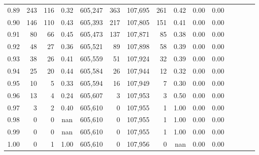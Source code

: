 \begin{tabular}{rrrcrrrrrrrrrrr}
0.89 &     243 &    116 &                                       0.32 &  605,247 &      363 &  107,695 &      261 &  0.42 &  0.00 &                         0.00 \\
0.90 &     146 &    110 &                                       0.43 &  605,393 &      217 &  107,805 &      151 &  0.41 &  0.00 &                         0.00 \\
0.91 &      80 &     66 &                                       0.45 &  605,473 &      137 &  107,871 &       85 &  0.38 &  0.00 &                         0.00 \\
0.92 &      48 &     27 &                                       0.36 &  605,521 &       89 &  107,898 &       58 &  0.39 &  0.00 &                         0.00 \\
0.93 &      38 &     26 &                                       0.41 &  605,559 &       51 &  107,924 &       32 &  0.39 &  0.00 &                         0.00 \\
0.94 &      25 &     20 &                                       0.44 &  605,584 &       26 &  107,944 &       12 &  0.32 &  0.00 &                         0.00 \\
0.95 &      10 &      5 &                                       0.33 &  605,594 &       16 &  107,949 &        7 &  0.30 &  0.00 &                         0.00 \\
0.96 &      13 &      4 &                                       0.24 &  605,607 &        3 &  107,953 &        3 &  0.50 &  0.00 &                         0.00 \\
0.97 &       3 &      2 &                                       0.40 &  605,610 &        0 &  107,955 &        1 &  1.00 &  0.00 &                         0.00 \\
0.98 &       0 &      0 &                                        nan &  605,610 &        0 &  107,955 &        1 &  1.00 &  0.00 &                         0.00 \\
0.99 &       0 &      0 &                                        nan &  605,610 &        0 &  107,955 &        1 &  1.00 &  0.00 &                         0.00 \\
1.00 &       0 &      1 &                                       1.00 &  605,610 &        0 &  107,956 &        0 &   nan &  0.00 &                         0.00 \\
\bottomrule
\end{tabular}
